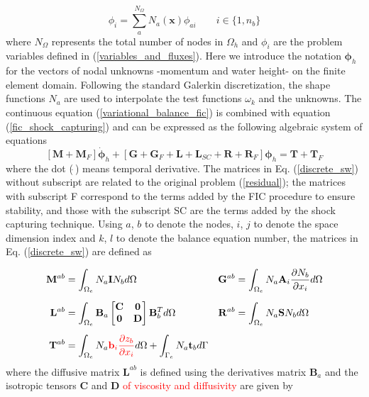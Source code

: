 \documentclass[a4paper,12pt]{elsarticle}
\newcommand{\Miguel}[1]{\textcolor{red}{#1}}
\newcommand{\pder}[2]{\frac{\partial#1}{\partial#2}}
\begin{document}
\begin{equation}
\phi_i = \sum_a^{N_\Omega} N_a(\mathbf{x})\phi_{ai} \qquad i \in \{1,n_b\}
\end{equation}
where $N_\Omega$ represents the total number of nodes in $\Omega_h$ and $\phi_i$ are the problem variables defined in (\ref{variables_and_fluxes}). Here we introduce the notation $\bm{\phi}_h$ for the vectors of nodal unknowns -momentum and water height- on the finite element domain. Following the standard Galerkin discretization, the shape functions $N_a$ are used to interpolate the test functions $\omega_k$ and the unknowns. The continuous equation (\ref{variational_balance_fic}) is combined with equation (\ref{fic_shock_capturing}) and can be expressed as the following algebraic system of equations
\begin{equation} \label{discrete_sw}
[\mathbf{M} + \mathbf{M}_F] \dot{\bm{\phi}}_h
+ [\mathbf{G} + \mathbf{G}_F + \mathbf{L} + \mathbf{L}_{SC} + \mathbf{R} + \mathbf{R}_F] \bm{\phi}_h
= \mathbf{T} + \mathbf{T}_F
\end{equation}
where the dot ($\dot{\ }$) means temporal derivative. The matrices in Eq. (\ref{discrete_sw}) without subscript are related to the original problem (\ref{residual}); the matrices with subscript F correspond to the terms added by the FIC procedure to ensure stability, and those with the subscript SC are the terms added by the shock capturing technique. Using $a$, $b$ to denote the nodes, $i$, $j$ to denote the space dimension index and $k$, $l$ to denote the balance equation number, the matrices in Eq. (\ref{discrete_sw}) are defined as

\begin{align}
    \displaystyle \mathbf{M}^{ab} &= \int_{\Omega_e}N_a \mathbf{I} N_b d\Omega &
    \displaystyle \mathbf{G}^{ab} &= \int_{\Omega_e}
        N_a \mathbf{A}_i \pder{N_b}{x_i} d\Omega \nonumber\\[5pt]
    \displaystyle \mathbf{L}^{ab} &= \int_{\Omega_e}
        \mathbf{B}_a \left[\begin{matrix}
            \mathbf{C} & \mathbf{0} \\ \mathbf{0} & \mathbf{D}
        \end{matrix}\right] \mathbf{B}_b^T d\Omega &
    \displaystyle \mathbf{R}^{ab} &= \int_{\Omega_e} N_a \mathbf{S} N_b d\Omega \\[5pt]
    \displaystyle \mathbf{T}^{ab} &= \int_{\Omega_e} N_a \Miguel{\mathbf{b}_i \pder{z_b}{x_i}} d\Omega +
        \int_{\Gamma_e} N_a \mathbf{t}_b d\Gamma \nonumber
\end{align}
where the diffusive matrix $\mathbf{L}^{ab}$ is defined using the derivatives matrix $\mathbf{B}_a$ and the isotropic tensors $\mathbf{C}$ and $\mathbf{D}$ \Miguel{of viscosity and diffusivity} are given by
\end{document}
